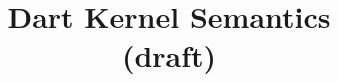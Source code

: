 \documentclass{article}
\begin{document}
\title{Dart Kernel Semantics \\ (draft)}
\maketitle
\end{document}
